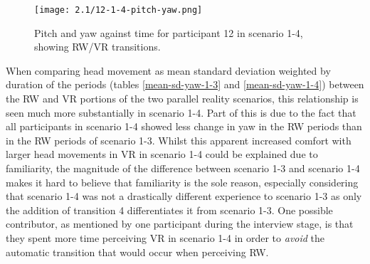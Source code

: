 \begin{figure}[h]
	\begin{center}
	\texttt{[image: 2.1/12-1-4-pitch-yaw.png]}
	\caption{Pitch and yaw against time for participant 12 in scenario 1-4, showing RW/VR transitions.}
	\label{12-1-4-pitch-yaw.png}
	\end{center}
\end{figure}

When comparing head movement as mean standard deviation weighted by duration of the periods (tables \ref{mean-sd-yaw-1-3} and \ref{mean-sd-yaw-1-4}) between the RW and VR portions of the two parallel reality scenarios, this relationship is seen much more substantially in scenario 1-4. Part of this is due to the fact that all participants in scenario 1-4 showed less change in yaw in the RW periods than in the RW periods of scenario 1-3. Whilst this apparent increased comfort with larger head movements in VR in scenario 1-4 could be explained due to familiarity, the magnitude of the difference between scenario 1-3 and scenario 1-4 makes it hard to believe that familiarity is the sole reason, especially considering that scenario 1-4 was not a drastically different experience to scenario 1-3 as only the addition of transition 4 differentiates it from scenario 1-3. One possible contributor, as mentioned by one participant during the interview stage, is that they spent more time perceiving VR in scenario 1-4 in order to \textit{avoid} the automatic transition that would occur when perceiving RW.

